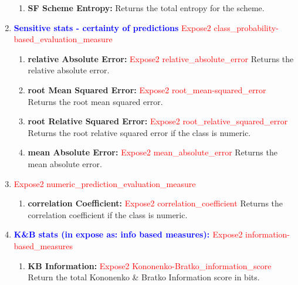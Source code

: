 \documentclass[a4paper,12pt, english]{article}
\begin{document}
\begin{enumerate}
\begin{enumerate}
\item \textbf{SF Scheme Entropy: }
          Returns the total entropy for the scheme. 

\end{enumerate}



\item \textbf{\textcolor{blue}{Sensitive stats - certainty of predictions}}  \textcolor{red}{Expose2 class\_probability-based\_evaluation\_measure}
\begin{enumerate}

\item \textbf{relative Absolute Error: }  \textcolor{red}{Expose2 relative\_absolute\_error}  
          Returns the relative absolute error. 

\item \textbf{root Mean Squared Error: }   \textcolor{red}{Expose2 root\_mean-squared\_error}  
          Returns the root mean squared error.           

\item \textbf{root Relative Squared Error: } \textcolor{red}{Expose2 root\_relative\_squared\_error}   
          Returns the root relative squared error if the class is numeric. 
                    
\item \textbf{mean Absolute Error: } \textcolor{red}{Expose2 mean\_absolute\_error} 
          Returns the mean absolute error. 
\end{enumerate}    


\item \textcolor{red}{Expose2 numeric\_prediction\_evaluation\_measure}
\begin{enumerate}
\item \textbf{correlation Coefficient: } \textcolor{red}{Expose2 correlation\_coefficient}
          Returns the correlation coefficient if the class is numeric.

\end{enumerate}    




\item  \textbf{\textcolor{blue}{K\&B stats (in expose as: info based measures): }} \textcolor{red}{Expose2 information-based\_measures}
\begin{enumerate}          
\item \textbf{KB Information: }   \textcolor{red}{Expose2 Kononenko-Bratko\_information\_score} 
          Return the total Kononenko \& Bratko Information score in bits. 
          

\end{enumerate}
\end{enumerate}
\end{document}
